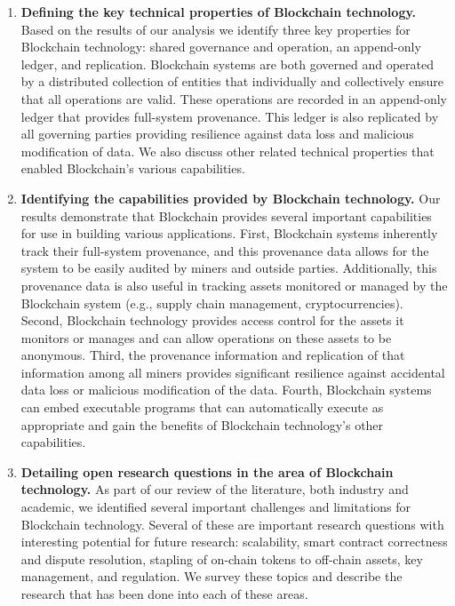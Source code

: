 \begin{enumerate}
	\item \textbf{Defining the key technical properties of Blockchain technology.}
	Based on the results of our analysis we identify three key properties for Blockchain technology: shared governance and operation, an append-only ledger, and replication.
	Blockchain systems are both governed and operated by a distributed collection of entities that individually and collectively ensure that all operations are valid.
	These operations are recorded in an append-only ledger that provides full-system provenance.
	This ledger is also replicated by all governing parties providing resilience against data loss and malicious modification of data.
	We also discuss other related technical properties that enabled Blockchain's various capabilities.
	
	\item \textbf{Identifying the capabilities provided by Blockchain technology.}
	Our results demonstrate that Blockchain provides several important capabilities for use in building various applications.
	First, Blockchain systems inherently track their full-system provenance, and this provenance data allows for the system to be easily audited by miners and outside parties.
	Additionally, this provenance data is also useful in tracking assets monitored or managed by the Blockchain system (e.g., supply chain management, cryptocurrencies).
	Second, Blockchain technology provides access control for the assets it monitors or manages and can allow operations on these assets to be anonymous.
	Third, the provenance information and replication of that information among all miners provides significant resilience against accidental data loss or malicious modification of the data.
	Fourth, Blockchain systems can embed executable programs that can automatically execute as appropriate and gain the benefits of Blockchain technology's other capabilities.
	
	\item \textbf{Detailing open research questions in the area of Blockchain technology.}
	As part of our review of the literature, both industry and academic, we identified several important challenges and limitations for Blockchain technology.
	Several of these are important research questions with interesting potential for future research: scalability, smart contract correctness and dispute resolution, stapling of on-chain tokens to off-chain assets, key management, and regulation.
	We survey these topics and describe the research that has been done into each of these areas.
	

\end{enumerate}
